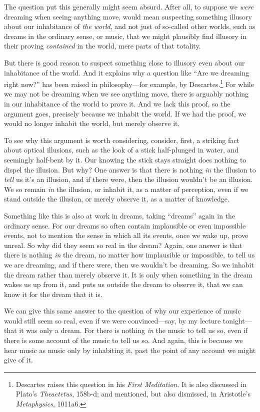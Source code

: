 \documentclass[12pt]{memoir}
\begin{document}
The question put this generally might seem absurd.
After all, to suppose we \emph{were} dreaming
when seeing anything move, would mean suspecting
something illusory about our inhabitance of
\emph{the world}, and not just of so-called other
worlds, such as dreams in the ordinary sense, or
music, that we might plausibly find illusory in
their proving \emph{contained} in the world, mere
parts of that totality.

But there is good reason to suspect something
close to illusory even about our inhabitance
of the world. And it explains why a question
like ``Are we dreaming right now?'' has
been raised in philosophy---for example, by
Descartes.\footnote{Descartes raises this question
in his \emph{First Meditation}. It is also
discussed in Plato's \emph{Theaetetus}, 158b-d;
and mentioned, but also dismissed, in Aristotle's
\emph{Metaphysics}, 1011a6.} For while we may
not be dreaming when we see anything move, there
is arguably nothing in our inhabitance of the
world to prove it. And we lack this proof, so the
argument goes, precisely because we inhabit the
world. If we had the proof, we would no longer
inhabit the world, but merely observe it.

To see why this argument is worth considering,
consider, first, a striking fact about optical
illusions, such as the look of a stick
half-plunged in water, and seemingly half-bent
by it. Our knowing the stick stays straight does
nothing to dispel the illusion. But why? One
answer is that there is nothing \emph{in} the
illusion to \emph{tell} us it's an illusion, and
if there were, then the illusion wouldn't be an
illusion. We so remain \emph{in} the illusion, or
inhabit it, as a matter of perception, even if we
stand outside the illusion, or merely observe it,
as a matter of knowledge.

Something like this is also at work in dreams,
taking ``dreams'' again in the ordinary sense.
For our dreams so often contain implausible or
even impossible events, not to mention the sense
in which all its events, once we wake up, prove
unreal. So why did they seem so real in the
dream? Again, one answer is that there is nothing
\emph{in} the dream, no matter how implausible or
impossible, to tell us we are dreaming, and if
there were, then we wouldn't be dreaming. So we
inhabit the dream rather than merely observe it.
It is only when something in the dream wakes us up
from it, and puts us outside the dream to observe
it, that we can know it for the dream that it is.

We can give this same answer to the question of
why our experience of music would still seem so
real, even if we were convinced---say, by my
lecture tonight---that it was only a dream. For
there is nothing \emph{in} the music to tell us
so, even if there is some account of the music to
tell us so. And again, this is because we hear
music as music only by inhabiting it, past the
point of any account we might give of it.
\end{document}
